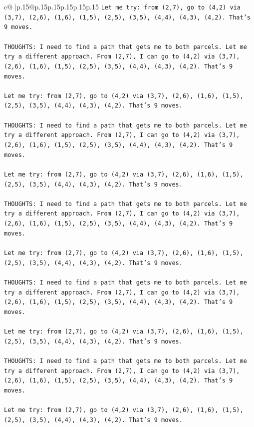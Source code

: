 \documentclass{article}
\begin{document}
{\begin{supertabular}{c@{$\;$}|p{.15\linewidth}@{}p{.15\linewidth}p{.15\linewidth}p{.15\linewidth}p{.15\linewidth}p{.15\linewidth}}
{{{\texttt{Let me try: from (2,7), go to (4,2) via (3,7), (2,6), (1,6), (1,5), (2,5), (3,5), (4,4), (4,3), (4,2). That's 9 moves.} \\
\\ 
\texttt{THOUGHTS: I need to find a path that gets me to both parcels. Let me try a different approach. From (2,7), I can go to (4,2) via (3,7), (2,6), (1,6), (1,5), (2,5), (3,5), (4,4), (4,3), (4,2). That's 9 moves.} \\
\\ 
\texttt{Let me try: from (2,7), go to (4,2) via (3,7), (2,6), (1,6), (1,5), (2,5), (3,5), (4,4), (4,3), (4,2). That's 9 moves.} \\
\\ 
\texttt{THOUGHTS: I need to find a path that gets me to both parcels. Let me try a different approach. From (2,7), I can go to (4,2) via (3,7), (2,6), (1,6), (1,5), (2,5), (3,5), (4,4), (4,3), (4,2). That's 9 moves.} \\
\\ 
\texttt{Let me try: from (2,7), go to (4,2) via (3,7), (2,6), (1,6), (1,5), (2,5), (3,5), (4,4), (4,3), (4,2). That's 9 moves.} \\
\\ 
\texttt{THOUGHTS: I need to find a path that gets me to both parcels. Let me try a different approach. From (2,7), I can go to (4,2) via (3,7), (2,6), (1,6), (1,5), (2,5), (3,5), (4,4), (4,3), (4,2). That's 9 moves.} \\
\\ 
\texttt{Let me try: from (2,7), go to (4,2) via (3,7), (2,6), (1,6), (1,5), (2,5), (3,5), (4,4), (4,3), (4,2). That's 9 moves.} \\
\\ 
\texttt{THOUGHTS: I need to find a path that gets me to both parcels. Let me try a different approach. From (2,7), I can go to (4,2) via (3,7), (2,6), (1,6), (1,5), (2,5), (3,5), (4,4), (4,3), (4,2). That's 9 moves.} \\
\\ 
\texttt{Let me try: from (2,7), go to (4,2) via (3,7), (2,6), (1,6), (1,5), (2,5), (3,5), (4,4), (4,3), (4,2). That's 9 moves.} \\
\\ 
\texttt{THOUGHTS: I need to find a path that gets me to both parcels. Let me try a different approach. From (2,7), I can go to (4,2) via (3,7), (2,6), (1,6), (1,5), (2,5), (3,5), (4,4), (4,3), (4,2). That's 9 moves.} \\
\\ 
\texttt{Let me try: from (2,7), go to (4,2) via (3,7), (2,6), (1,6), (1,5), (2,5), (3,5), (4,4), (4,3), (4,2). That's 9 moves.} \\
}}}
\end{supertabular}}
\end{document}

